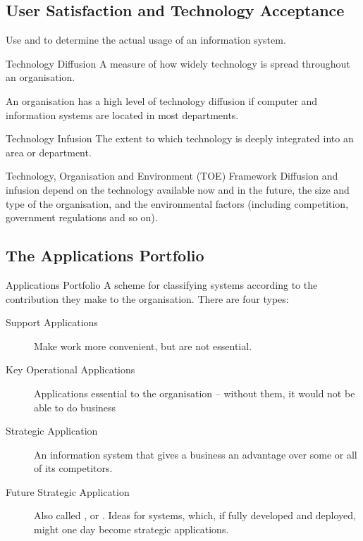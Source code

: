 \documentclass[\main/notes.tex]{subfiles}
\begin{document}
			\subsection{User Satisfaction and Technology Acceptance}
				Use  and  to determine the actual usage of an information system.
				\begin{definition}{Technology Diffusion}
					A measure of how widely technology is spread throughout an organisation.

					An organisation has a high level of technology diffusion if computer and information systems are located in most departments.
				\end{definition}
				\begin{definition}{Technology Infusion}
					The extent to which technology is deeply integrated into an area or department. 
				\end{definition}
				\begin{sidenote}{Technology, Organisation and Environment (TOE) Framework}
					Diffusion and infusion depend on the technology available now and in the future, the size and type of the organisation, and the environmental factors (including competition, government regulations and so on).
				\end{sidenote}

			\subsection{The Applications Portfolio}
				\begin{definition}{Applications Portfolio}
					A scheme for classifying systems according to the contribution they make to the organisation. There are four types:
					\begin{description}
						\item[Support Applications] Make work more convenient, but are not essential.
						\item[Key Operational Applications] Applications essential to the organisation -- without them, it would not be able to do business
						\item[Strategic Application] An information system that gives a business an advantage over some or all of its competitors.
						\item[Future Strategic Application] Also called , or . Ideas for systems, which, if fully developed and deployed, might one day become strategic applications.
					\end{description}
				\end{definition}
			\pagebreak
\end{document}
